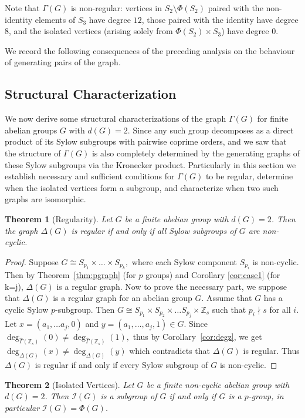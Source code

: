 \documentclass[11pt]{article}
\def \Z {{\mathbb Z}}
\def \I {{\mathcal I}}
\def \Ga {{\Gamma}}
\newtheorem{theorem}{Theorem}[section]
\begin{document}
\newpage
Note that $\Gamma(G)$ is non-regular: vertices in $S_2 \setminus \Phi(S_2)$ 
paired with the non-identity elements of $S_3$ have degree $12$, those paired 
with the identity have degree $8$, and the isolated vertices (arising solely 
from $\Phi(S_2) \times S_3$) have degree $0$. 

We record the following consequences of the preceding analysis on the behaviour of generating pairs of the graph.
\subsection{Structural Characterization}
We now derive some structural characterizations of the graph 
$\Gamma(G)$ for finite abelian groups $G$ with $d(G) = 2$. Since any 
such group decomposes as a direct product of its Sylow subgroups with 
pairwise coprime orders, and we saw that the structure of $\Gamma(G)$ is also completely 
determined by the generating graphs of these Sylow subgroups via the 
Kronecker product. Particularly in this section we establish necessary and sufficient 
conditions for $\Gamma(G)$ to be regular, determine when the isolated 
vertices form a subgroup, and characterize when two such graphs are 
isomorphic.
\begin{theorem}[Regularity]
    Let \(G\) be a finite abelian group with $d(G)=2$.  Then the graph \(\Delta(G)\) is regular if and only if all Sylow subgroups of $G$ are non-cyclic.
    \end{theorem}
    \begin{proof}
    Suppose $G\cong S_{p_1}\times \dots \times S_{p_k},$ where each Sylow component $S_{p_i}$ is non-cyclic. Then by Theorem~\ref{thm:pgraph} (for $p$ groups) and Corollary \ref{cor:case1} (for k=j), $\Delta(G)$ is a regular graph. Now to prove the necessary part, we suppose that $\Delta(G)$ is a regular graph for an abelian group $G.$ Assume that $G$ has a cyclic Sylow $p$-subgroup. Then $G\cong S_{p_1}\times S_{p_2}\times \dots S_{p_j}\times \Z_s$ such that $p_i\nmid s$ for all $i.$ Let $x=(a_1,\dots a_j,0)$ and $y=(a_1,\dots,a_j,1)\in G.$ Since $\deg_{\widehat \Ga(\Z_s)}(0)\neq \deg_{\widehat\Ga(\Z_s)} (1),$ thus by Corollary~\ref{cor:degz}, we get $\deg_{\Delta(G)}(x)\neq \deg_{\Delta(G)}(y)$ which contradicts that $\Delta(G)$ is regular. Thus $\Delta(G)$ is regular if and only if every Sylow subgroup of $G$ 
    is non-cyclic.
    \end{proof}
    \begin{theorem}[Isolated Vertices]\label{thm:subgroup}
        Let $G$ be a finite non-cyclic abelian group with $d(G) = 2$. Then 
        $\I(G)$ is a subgroup of $G$ if and only if $G$ is a $p$-group, in  particular $\I(G) = \Phi(G)$.
    \end{theorem}
\end{document}
